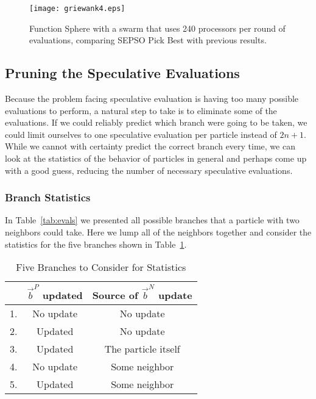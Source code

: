 \documentclass[journal,letterpaper]{IEEEtran}
\providecommand{\pers}{\ensuremath{P}}
\providecommand{\neigh}{\ensuremath{N}}
\providecommand{\nbest}{\ensuremath{\Vec{b}^\neigh}}
\providecommand{\pbest}{\ensuremath{\Vec{b}^\pers}}
\begin{document}
\begin{figure}
  \centering
  \texttt{[image: griewank4.eps]}
  \caption{Function Sphere with a swarm that uses 240 processors per round of
  evaluations, comparing SEPSO Pick Best with previous results.}
  \label{fig:griewank-pickbest}
\end{figure}

\subsection{Pruning the Speculative Evaluations}

Because the problem facing speculative evaluation is having too many possible
evaluations to perform, a natural step to take is to eliminate some of the
evaluations.  If we could reliably predict which branch were going to be taken,
we could limit ourselves to one speculative evaluation per particle instead of
$2n+1$.  While we cannot with certainty predict the correct branch every time,
we can look at the statistics of the behavior of particles in general and
perhaps come up with a good guess, reducing the number of necessary speculative
evaluations.

\subsubsection{Branch Statistics}

In Table~\ref{tab:evals} we presented all possible branches that a particle
with two neighbors could take.  Here we lump all of the neighbors together and
consider the statistics for the five branches shown in Table~\ref{tab:branches}.

\begin{table}[h]
  \caption{Five Branches to Consider for Statistics}
  \label{tab:branches}
  \centering
  \begin{tabular}{rc|c}
	&$\pbest$ updated&Source of $\nbest$ update\\
	\hline
	1.&No update&No update\\
	2.&Updated&No update\\
	3.&Updated&The particle itself\\
	4.&No update&Some neighbor\\
	5.&Updated&Some neighbor\\
  \end{tabular}
\end{table}
\end{document}
